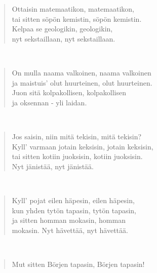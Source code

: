 \noindent\begin{minipage}{\linewidth}
\begin{verse}
	Ottaisin matemaatikon, matemaatikon,\\
	tai sitten söpön kemistin, söpön kemistin.\\
	Kelpaa se geologikin, geologikin,\\
	nyt sekstaillaan, nyt sekstaillaan.\\
\end{verse}
\end{minipage}\\[10pt]
\noindent\begin{minipage}{\linewidth}
\begin{verse}
	On mulla naama valkoinen, naama valkoinen\\
	ja maistuis' olut huurteinen, olut huurteinen.\\
	Juon sitä kolpakollisen, kolpakollisen\\
	ja oksennan - yli laidan.\\
\end{verse}
\end{minipage}\\[10pt]
\noindent\begin{minipage}{\linewidth}
\begin{verse}
	Jos saisin, niin mitä tekisin, mitä tekisin?\\
	Kyll' varmaan jotain keksisin, jotain keksisin,\\
	tai sitten kotiin juoksisin, kotiin juoksisin.\\
	Nyt jänistää, nyt jänistää.\\
\end{verse}
\end{minipage}\\[10pt]
\noindent\begin{minipage}{\linewidth}
\begin{verse}
	Kyll' pojat eilen häpesin, eilen häpesin,\\
	kun yhden tytön tapasin, tytön tapasin,\\
	ja sitten homman mokasin, homman\\
	mokasin. Nyt hävettää, nyt hävettää.\\
\end{verse}
\end{minipage}\\[10pt]
\noindent\begin{minipage}{\linewidth}
\begin{verse}
	Mut sitten Börjen tapasin, Börjen tapasin!\\
\end{verse}
\end{minipage}\\[10pt]
